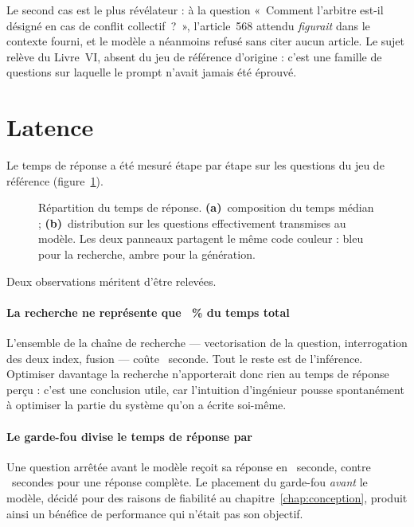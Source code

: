 Le second cas est le plus révélateur : à la question «~Comment l'arbitre est-il désigné en cas de
conflit collectif~?~», l'article~568 attendu \emph{figurait} dans le contexte fourni, et le modèle
a néanmoins refusé sans citer aucun article. Le sujet relève du Livre~VI, absent du jeu de
référence d'origine : c'est une famille de questions sur laquelle le prompt n'avait jamais été
éprouvé.

\section{Latence}

Le temps de réponse a été mesuré étape par étape sur les \NbQuestions{} questions du jeu de
référence (figure~\ref{fig:latence}).

\begin{figure}[htbp]
  \centering
  
  \caption[Répartition du temps de réponse]{Répartition du temps de réponse.
  \textbf{(a)}~composition du temps médian ; \textbf{(b)}~distribution sur les questions
  effectivement transmises au modèle. Les deux panneaux partagent le même code couleur :
  bleu pour la recherche, ambre pour la génération.}
  \label{fig:latence}
\end{figure}

Deux observations méritent d'être relevées.

\paragraph{La recherche ne représente que \PartRecherche~\% du temps total}
L'ensemble de la chaîne de recherche --- vectorisation de la question, interrogation des deux
index, fusion --- coûte \LatRecherche~seconde. Tout le reste est de l'inférence. Optimiser
davantage la recherche n'apporterait donc rien au temps de réponse perçu : c'est une conclusion
utile, car l'intuition d'ingénieur pousse spontanément à optimiser la partie du système qu'on a
écrite soi-même.

\paragraph{Le garde-fou divise le temps de réponse par \FacteurGarde{}}
Une question arrêtée avant le modèle reçoit sa réponse en \LatAbstention~seconde, contre
\LatTotale~secondes pour une réponse complète. Le placement du garde-fou \emph{avant} le modèle,
décidé pour des raisons de fiabilité au chapitre~\ref{chap:conception}, produit ainsi un bénéfice
de performance qui n'était pas son objectif.

